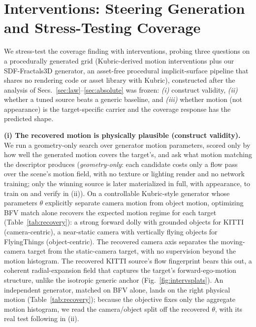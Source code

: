\section{Interventions: Steering Generation and Stress-Testing Coverage}
\label{sec:interv}

We stress-test the coverage finding with interventions, probing three
questions on a procedurally generated grid (Kubric-derived motion interventions
\cite{greff2021kubric} plus our SDF-Fractals3D generator, an asset-free procedural
implicit-surface pipeline that shares no rendering code or asset library with
Kubric), constructed after the
analysis of Secs.~\ref{sec:law}--\ref{sec:absolute} was frozen: \emph{(i)}
construct validity, \emph{(ii)} whether a tuned source beats a generic baseline,
and \emph{(iii)} whether motion (not appearance) is the target-specific carrier
and the coverage response has the predicted shape.

\begin{table}[tbp]
\centering
\caption{\textbf{Recovered generator parameters $\theta$} from BFV-only
search. The camera/object decomposition is read off $\theta$ and
matches each target's known physics; full parameter set in supplement.}
\label{tab:recovery}
\small

\end{table}

\noindent\textbf{(i) The recovered motion is physically plausible
(construct validity).}
We run a geometry-only search over generator motion parameters, scored only by how
well the generated motion covers the target's, and ask what motion matching the
descriptor produces (\emph{geometry-only}: each candidate costs only a
flow pass over the scene's motion field, with no texture or lighting render and no
network training; only the winning source is later materialized in full, with
appearance, to train on and verify in (ii)).
On a
controllable Kubric-style generator whose parameters $\theta$ explicitly
separate camera motion from object motion, optimizing BFV match alone recovers
the expected motion regime for each target (Table~\ref{tab:recovery}): a strong
forward dolly with grounded objects for
KITTI (camera-centric), a near-static camera with vertically flying objects for
FlyingThings (object-centric). The recovered camera axis separates the
moving-camera target from the static-camera target, with no supervision beyond
the motion histogram. The recovered KITTI source's flow fingerprint bears this
out, a coherent radial-expansion field that captures the target's
forward-ego-motion structure, unlike the isotropic generic anchor
(Fig.~\ref{fig:intervsplats}). An independent generator, matched on BFV alone,
lands on the right physical motion (Table~\ref{tab:recovery}); because the
objective fixes only the aggregate motion histogram, we read the camera/object
split off the recovered $\theta$, with its real test following in (ii).

